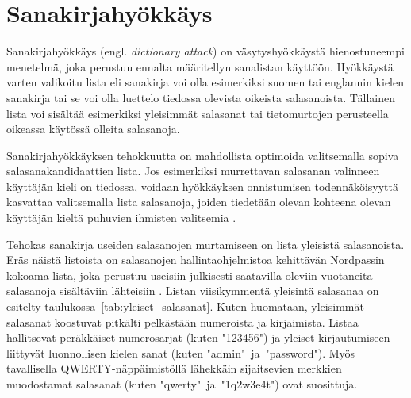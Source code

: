 \section{Sanakirjahyökkäys\label{sec:sanakirjahyokkays}}

Sanakirjahyökkäys (engl. \textit{dictionary attack}) on väsytyshyökkäystä hienostuneempi menetelmä, joka perustuu ennalta määritellyn sanalistan käyttöön. Hyökkäystä varten valikoitu lista eli sanakirja voi olla esimerkiksi suomen tai englannin kielen sanakirja tai se voi olla luettelo tiedossa olevista oikeista salasanoista. Tällainen lista voi sisältää esimerkiksi yleisimmät salasanat tai tietomurtojen perusteella oikeassa käytössä olleita salasanoja.

Sanakirjahyökkäyksen tehokkuutta on mahdollista optimoida valitsemalla sopiva salasanakandidaattien lista. Jos esimerkiksi murrettavan salasanan valinneen käyttäjän kieli on tiedossa, voidaan hyökkäyksen onnistumisen todennäköisyyttä kasvattaa valitsemalla lista salasanoja, joiden tiedetään olevan kohteena olevan käyttäjän kieltä puhuvien ihmisten valitsemia \citep{bonnea_guessing_2012}.

Tehokas sanakirja useiden salasanojen murtamiseen on lista yleisistä salasanoista. Eräs näistä listoista on salasanojen hallintaohjelmistoa kehittävän Nordpassin kokoama lista, joka perustuu useisiin julkisesti saatavilla oleviin vuotaneita salasanoja sisältäviin lähteisiin \citep{nordpass_2023}. Listan viisikymmentä yleisintä salasanaa on esitelty taulukossa~\ref{tab:yleiset_salasanat}. Kuten huomataan, yleisimmät salasanat koostuvat pitkälti pelkästään numeroista ja kirjaimista. Listaa hallitsevat peräkkäiset numerosarjat (kuten "123456") ja yleiset kirjautumiseen liittyvät luonnollisen kielen sanat (kuten "admin"~ja~"password"). Myös tavallisella QWERTY-näppäimistöllä lähekkäin sijaitsevien merkkien muodostamat salasanat (kuten "qwerty"~ja~"1q2w3e4t") ovat suosittuja.

